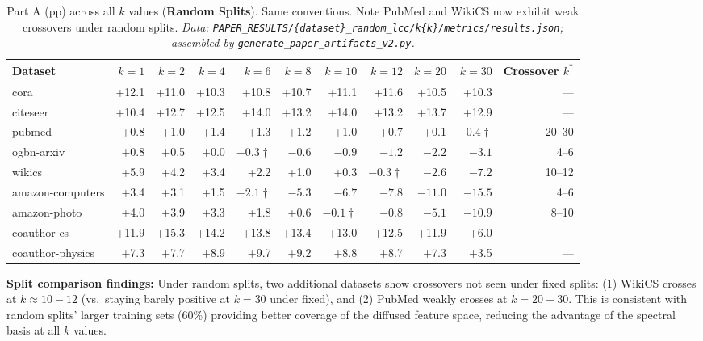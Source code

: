 \documentclass[11pt]{article}
\begin{document}
\begin{table}[H]
\centering\scriptsize\setlength{\tabcolsep}{3pt}
\caption{Part A (pp) across all $k$ values (\textbf{Random Splits}).  Same conventions.
Note PubMed and WikiCS now exhibit weak crossovers under random splits.
\textit{\scriptsize Data: \texttt{PAPER\_RESULTS/\{dataset\}\_random\_lcc/k\{k\}/metrics/results.json};
assembled by \texttt{generate\_paper\_artifacts\_v2.py}.}}
\label{tab:part_a_k_sweep_random}
\begin{tabular}{lrrrrrrrrrr}
\toprule
Dataset & $k{=}1$ & $k{=}2$ & $k{=}4$ & $k{=}6$ & $k{=}8$ & $k{=}10$ & $k{=}12$ & $k{=}20$ & $k{=}30$ & Crossover $k^*$ \\
\midrule
cora & +12.1 & +11.0 & +10.3 & +10.8 & +10.7 & +11.1 & +11.6 & +10.5 & +10.3 & --- \\
citeseer & +10.4 & +12.7 & +12.5 & +14.0 & +13.2 & +14.0 & +13.2 & +13.7 & +12.9 & --- \\
pubmed & +0.8 & +1.0 & +1.4 & +1.3 & +1.2 & +1.0 & +0.7 & +0.1 & $-0.4\dagger$ & 20--30 \\
ogbn-arxiv & +0.8 & +0.5 & +0.0 & $-0.3\dagger$ & $-0.6$ & $-0.9$ & $-1.2$ & $-2.2$ & $-3.1$ & 4--6 \\
wikics & +5.9 & +4.2 & +3.4 & +2.2 & +1.0 & +0.3 & $-0.3\dagger$ & $-2.6$ & $-7.2$ & 10--12 \\
amazon-computers & +3.4 & +3.1 & +1.5 & $-2.1\dagger$ & $-5.3$ & $-6.7$ & $-7.8$ & $-11.0$ & $-15.5$ & 4--6 \\
amazon-photo & +4.0 & +3.9 & +3.3 & +1.8 & +0.6 & $-0.1\dagger$ & $-0.8$ & $-5.1$ & $-10.9$ & 8--10 \\
coauthor-cs & +11.9 & +15.3 & +14.2 & +13.8 & +13.4 & +13.0 & +12.5 & +11.9 & +6.0 & --- \\
coauthor-physics & +7.3 & +7.7 & +8.9 & +9.7 & +9.2 & +8.8 & +8.7 & +7.3 & +3.5 & --- \\
\bottomrule
\end{tabular}
\end{table}

\noindent\textbf{Split comparison findings:}
Under random splits, two additional datasets show crossovers not seen under fixed splits:
(1) WikiCS crosses at $k{\approx}10{-}12$ (vs.\ staying barely positive at $k{=}30$
under fixed), and (2) PubMed weakly crosses at $k{=}20{-}30$.
This is consistent with random splits' larger training sets (60\%) providing better
coverage of the diffused feature space, reducing the advantage of the spectral basis
at all $k$ values.
\end{document}
